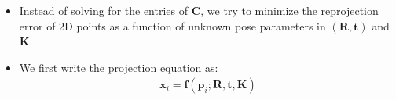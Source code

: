 \documentclass[10pt]{article}
\newcommand{\ve}[1]{\mathbf{#1}}
\begin{document}
  \begin{itemize}
    \item Instead of solving for the entries of $\ve{C}$, we try to minimize the reprojection
      error of 2D points as a function of unknown pose parameters in $(\ve{R}, \ve{t})$ and $\ve{K}$.
      
    \item We first write the projection equation as:
      \begin{align*}
        \ve{x}_i = \ve{f}(\ve{p}_i; \ve{R}, \ve{t}, \ve{K})
      \end{align*}      
  \end{itemize}
  
  
\end{document}

